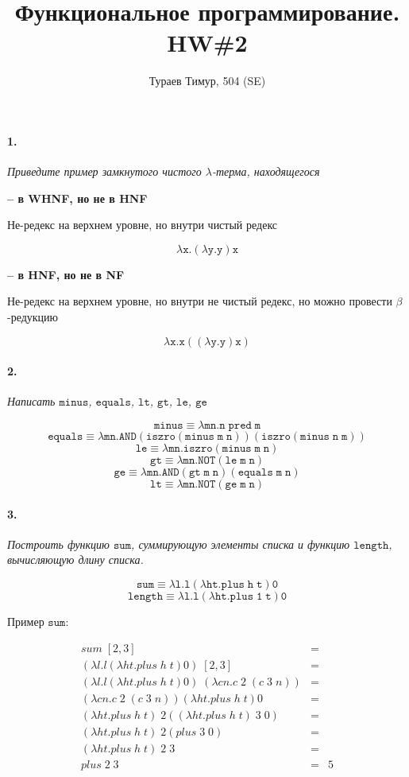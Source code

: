 \documentclass[russian]{article}
\begin{document}
\title{Функциональное программирование. HW\#2}
\author{Тураев Тимур, 504 (SE)}

\maketitle

\paragraph*{1.}

\textit{Приведите пример замкнутого чистого $\lambda$-терма, находящегося}


\textbf{-- в WHNF, но не в HNF}

Не-редекс на верхнем уровне, но внутри чистый редекс 

\[
\mathtt{\lambda x.(\lambda y.y)x}
\]


\textbf{-- в HNF, но не в NF}

Не-редекс на верхнем уровне, но внутри не чистый редекс, но можно провести $\beta$-редукцию

\[
\mathtt{\lambda x.x((\lambda y.y)x)}
\]


\paragraph*{2.} \textit{Написать $\mathtt{minus}$, $\mathtt{equals}$, $\mathtt{lt}$, $\mathtt{gt}$, $\mathtt{le}$, $\mathtt{ge}$}

\[
\mathtt{minus \equiv \lambda mn.n\;pred\;m}
\]
\[
\mathtt{equals \equiv \lambda mn.AND(iszro(minus\; m\; n))(iszro(minus\; n\; m))}
\]
\[
\mathtt{le \equiv \lambda mn.iszro(minus\; m\; n)}
\]
\[
\mathtt{gt \equiv \lambda mn.NOT(le\; m\; n)}
\]
\[
\mathtt{ge \equiv \lambda mn.AND(gt\; m\; n)(equals\; m\; n)}
\]
\[
\mathtt{lt \equiv \lambda mn.NOT(ge\; m\; n)}
\]


\paragraph*{3.} \textit{Построить функцию $\mathtt{sum}$, суммирующую элементы списка и функцию $\mathtt{length}$, вычисляющую длину списка.}

\[
\mathtt{sum \equiv \lambda l.l(\lambda ht.plus\; h\; t)0}
\]
\[
\mathtt{length \equiv \lambda l.l(\lambda ht.plus\; 1\; t)0}
\]

Пример $\mathtt{sum}$:

\begin{eqnarray*}
sum\; [2, 3] & =\\
(\lambda l.l(\lambda ht.plus\; h\; t)0)\; [2, 3] &=\\
(\lambda l.l(\lambda ht.plus\; h\; t)0)\; (\lambda cn.c\;2\;(c\;3\;n)) &=\\
(\lambda cn.c\;2\;(c\;3\;n))(\lambda ht.plus\; h\; t)0 & =\\
(\lambda ht.plus\; h\; t)\; 2((\lambda ht.plus\; h\; t)\; 3\; 0) &=\\
(\lambda ht.plus\; h\; t)\; 2(plus\; 3\; 0) &=\\
(\lambda ht.plus\; h\; t)\; 2\; 3 &=\\
plus\; 2\; 3 &= &5
\end{eqnarray*}
\end{document}
